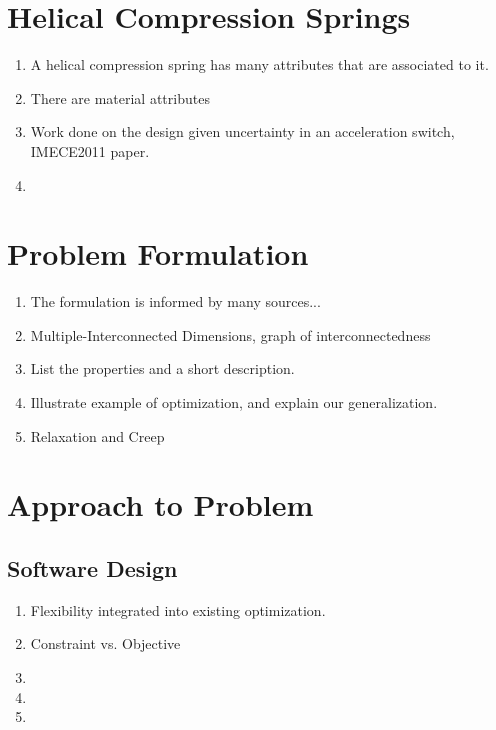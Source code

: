 \documentclass[11pt]{article}
\begin{document}
	\section{Helical Compression Springs}
	\begin{enumerate}
		
		\item A helical compression spring has many attributes that are associated to it. 
		
		\item There are material attributes
		
		\item Work done on the design given uncertainty in an acceleration switch, IMECE2011 paper.
		
		\item
		

		
	\end{enumerate}


\section{Problem Formulation}

	\begin{enumerate}
	
		\item The formulation is informed by many sources... 
				
		\item Multiple-Interconnected Dimensions, graph of interconnectedness
	
		\item List the properties and a short description.
		
		\item Illustrate example of optimization, and explain our generalization.
		
		\item Relaxation and Creep
		
	\end{enumerate}
	
	
\section{Approach to Problem}

\subsection{Software Design}
	\begin{enumerate}
	
		
		
		\item Flexibility integrated into existing optimization.
				
		\item Constraint vs. Objective
	
		\item 
		
		\item 
		
		\item 
		
	\end{enumerate}
	
\end{document}
